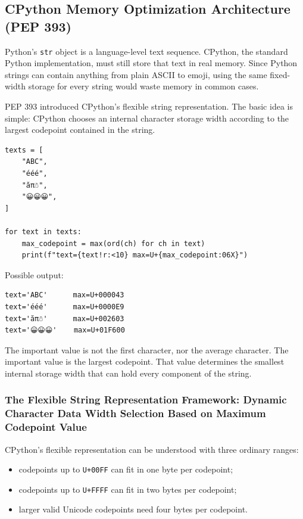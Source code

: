 \subsection{CPython Memory Optimization Architecture (PEP 393)}

Python's \texttt{str} object is a language-level text sequence. CPython, the standard Python implementation, must still store that text in real memory. Since Python strings can contain anything from plain ASCII to emoji, using the same fixed-width storage for every string would waste memory in common cases.

PEP 393 introduced CPython's flexible string representation. The basic idea is simple: CPython chooses an internal character storage width according to the largest codepoint contained in the string.

\begin{verbatim}
texts = [
    "ABC",
    "ééé",
    "ăπ☃",
    "😀😀😀",
]

for text in texts:
    max_codepoint = max(ord(ch) for ch in text)
    print(f"text={text!r:<10} max=U+{max_codepoint:06X}")
\end{verbatim}

Possible output:

\begin{verbatim}
text='ABC'      max=U+000043
text='ééé'      max=U+0000E9
text='ăπ☃'      max=U+002603
text='😀😀😀'    max=U+01F600
\end{verbatim}

The important value is not the first character, nor the average character. The important value is the largest codepoint. That value determines the smallest internal storage width that can hold every component of the string.

\subsubsection{The Flexible String Representation Framework: Dynamic Character Data Width Selection Based on Maximum Codepoint Value}

CPython's flexible representation can be understood with three ordinary ranges:

\begin{itemize}
    \item codepoints up to \texttt{U+00FF} can fit in one byte per codepoint;
    \item codepoints up to \texttt{U+FFFF} can fit in two bytes per codepoint;
    \item larger valid Unicode codepoints need four bytes per codepoint.
\end{itemize}

